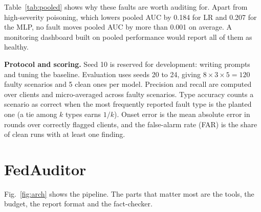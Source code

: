 \documentclass[conference]{IEEEtran}
\newcommand{\figdir}{../results/fedauditor/figures}
\begin{document}


Table~\ref{tab:pooled} shows why these faults are worth auditing for. Apart from high-severity
poisoning, which lowers pooled AUC by 0.184 for LR and 0.207 for the MLP, no fault moves pooled AUC by
more than 0.001 on average. A monitoring dashboard built on pooled performance would report all of
them as healthy.

\textbf{Protocol and scoring.} Seed 10 is reserved for development: writing prompts and tuning the
baseline. Evaluation uses seeds 20 to 24, giving $8 \times 3 \times 5 = 120$ faulty scenarios and 5
clean ones per model. Precision and recall are computed over clients and micro-averaged across
faulty scenarios. Type accuracy counts a scenario as correct when the most frequently reported fault
type is the planted one (a tie among $k$ types earns $1/k$). Onset error is the mean absolute error
in rounds over correctly flagged clients, and the false-alarm rate (FAR) is the share of clean runs
with at least one finding.

\section{FedAuditor}

Fig.~\ref{fig:arch} shows the pipeline. The parts that matter most are the tools, the budget, the
report format and the fact-checker.
\end{document}
